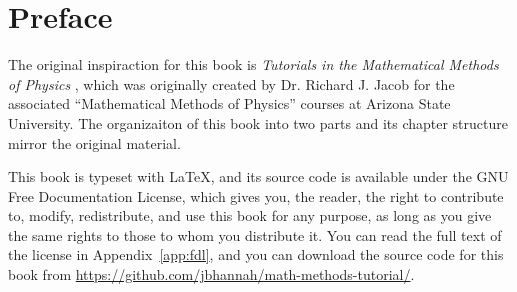 \chapter{Preface}

The original inspiraction for this book is \textit{Tutorials in the Mathematical
Methods of Physics} \cite{rjjacob}, which was originally created by Dr. Richard
J. Jacob for the associated ``Mathematical Methods of Physics'' courses at
Arizona State University. The organizaiton of this book into two parts and its
chapter structure mirror the original material.

This book is typeset with \LaTeX, and its source code is available under the GNU
Free Documentation License, which gives you, the reader, the right to contribute
to, modify, redistribute, and use this book for any purpose, as long as you give
the same rights to those to whom you distribute it. You can read the full text
of the license in Appendix~\ref{app:fdl}, and you can download the source code
for this book from \url{https://github.com/jbhannah/math-methods-tutorial/}.
